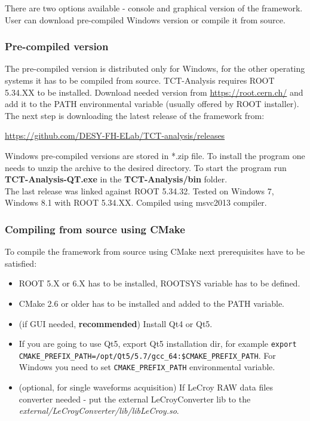 \documentclass[12pt,oneside,notitlepage,abstracton,a4paper]{scrartcl}
\begin{document}
There are two options available - console and graphical version of the framework. User can download pre-compiled Windows version or compile it from source.

\subsubsection{Pre-compiled version}

The pre-compiled version is distributed only for Windows, for the other operating systems it has to be compiled from source. TCT-Analysis requires ROOT 5.34.XX to be installed. Download needed version from \url{https://root.cern.ch/} and add it to the PATH environmental variable (usually offered by ROOT installer).
\\ \indent The next step is downloading the latest release of the framework from:
\begin{displayquote}
\url{https://github.com/DESY-FH-ELab/TCT-analysis/releases}
\end{displayquote}
Windows pre-compiled versions are stored in *.zip file. To install the program one needs to unzip the archive to the desired directory.
To start the program run \textbf{TCT-Analysis-QT.exe} in the \textbf{TCT-Analysis/bin} folder.
\\ \indent The last release was linked against ROOT 5.34.32. Tested on Windows 7, Windows 8.1 with ROOT 5.34.XX. Compiled using msvc2013 compiler.

\subsubsection{Compiling from source using CMake}

To compile the framework from source using CMake next prerequisites have to be satisfied:
\begin{itemize}
\item ROOT 5.X or 6.X has to be installed, ROOTSYS variable has to be defined.
\item CMake 2.6 or older has to be installed and added to the PATH variable.
\item (if GUI needed, \textbf{recommended}) Install Qt4 or Qt5.
\item If you are going to use Qt5, export Qt5 installation dir, for example \lstinline{export CMAKE_PREFIX_PATH=/opt/Qt5/5.7/gcc_64:$CMAKE_PREFIX_PATH}. For Windows you need to set \lstinline{CMAKE_PREFIX_PATH} environmental variable.
\item (optional, for single waveforms acquisition) If LeCroy RAW data files converter needed - put the external LeCroyConverter lib to the \textit{external/LeCroyConverter/lib/libLeCroy.so}.
\end{itemize}
\end{document}
